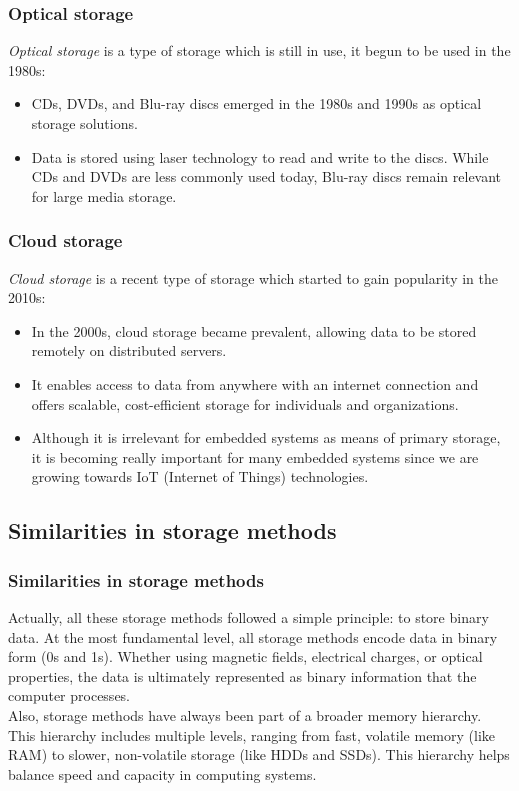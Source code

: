 \documentclass[aspectratio=169]{beamer}
\begin{document}
\begin{frame}
  \frametitle{Optical storage}
  \textit{Optical storage} is a type of storage which is still in use, it begun to be used in the 1980s: \pause
  \begin{itemize}
    \item CDs, DVDs, and Blu-ray discs emerged in the 1980s and 1990s as optical storage solutions. \pause
    \item Data is stored using laser technology to read and write to the discs. While CDs and DVDs are less commonly used today, Blu-ray discs remain relevant for large media storage.
  \end{itemize}
\end{frame}

\begin{frame}
  \frametitle{Cloud storage}
  \textit{Cloud storage} is a recent type of storage which started to gain popularity in the 2010s: \pause
  \begin{itemize}
    \item In the 2000s, cloud storage became prevalent, allowing data to be stored remotely on distributed servers. \pause
    \item It enables access to data from anywhere with an internet connection and offers scalable, cost-efficient storage for individuals and organizations. \pause
    \item Although it is irrelevant for embedded systems as means of primary storage, it is becoming really important for many embedded systems since we are growing towards IoT (Internet of Things) technologies.
  \end{itemize}
\end{frame}

\subsection{Similarities in storage methods}

\begin{frame}
  \frametitle{Similarities in storage methods}
  Actually, all these storage methods followed a simple principle: to store binary data. At the most fundamental level, all storage methods encode data in binary form (0s and 1s). Whether using magnetic fields, electrical charges, or optical properties, the data is ultimately represented as binary information that the computer processes. \\ \pause
  Also, storage methods have always been part of a broader memory hierarchy. This hierarchy includes multiple levels, ranging from fast, volatile memory (like RAM) to slower, non-volatile storage (like HDDs and SSDs). This hierarchy helps balance speed and capacity in computing systems. 
\end{frame}
\end{document}
